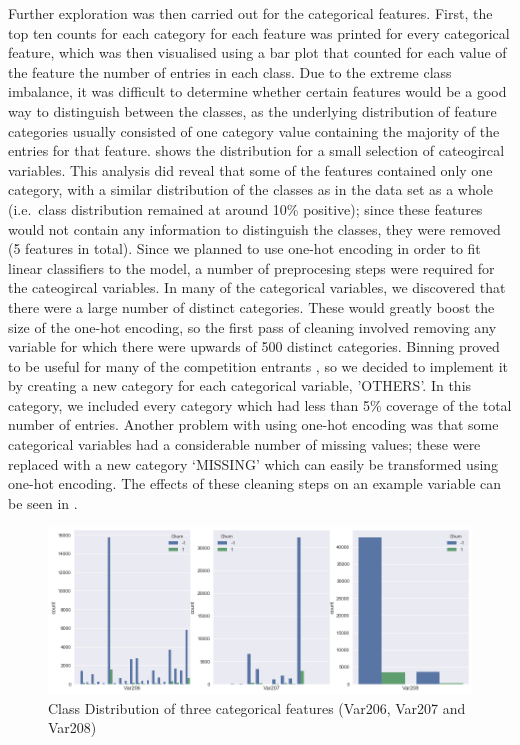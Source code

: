 \documentclass{article}
\begin{document}
Further exploration was then carried out for the categorical features.
First, the top ten counts for each category for each feature was printed for every categorical feature, which was then visualised using a bar plot that counted for each value of the feature the number of entries in each class.
Due to the extreme class imbalance, it was difficult to determine whether certain features would be a good way to distinguish between the classes, as the underlying distribution of feature categories usually consisted of one category value containing the majority of the entries for that feature.  shows the distribution for a small selection of cateogircal variables.
This analysis did reveal that some of the features contained only one category, with a similar distribution of the classes as in the data set as a whole (i.e.\ class distribution remained at around 10\% positive); since these features would not contain any information to distinguish the classes, they were removed (5 features in total). Since we planned to use one-hot encoding in order to fit linear classifiers to the model, a number of preprocesing steps were required for the cateogircal variables.
In many of the categorical variables, we discovered that there were a large number of distinct categories.
These would greatly boost the size of the one-hot encoding, so the first pass of cleaning involved removing any variable for which there were upwards of 500 distinct categories.
Binning proved to be useful for many of the competition entrants \cite{guyon2009analysis}, so we decided to implement it by creating a new category for each categorical variable, 'OTHERS'.
In this category, we included every category which had less than 5\% coverage of the total number of entries.
Another problem with using one-hot encoding was that some categorical variables had a considerable number of missing values; these were replaced with a new category `MISSING' which can easily be transformed using one-hot encoding.
The effects of these cleaning steps on an example variable can be seen in .

\begin{figure}[htbp]
\vskip 5mm
\begin{center}
\centerline{\includegraphics[width=5in]{graph/CategoricalDistribution.png}}
\caption{Class Distribution of three categorical features (Var206, Var207 and Var208)}
\label{fig:3_cat}
\end{center}
\vskip -5mm
\end{figure}
\end{document}
